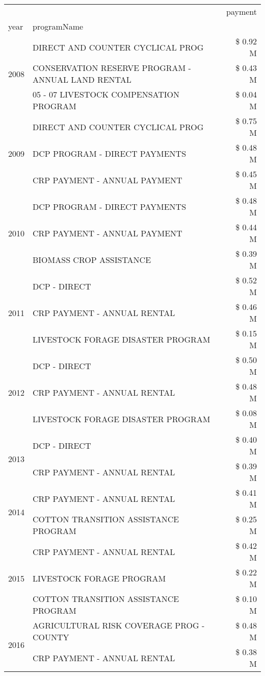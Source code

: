 \begin{tabular}{llr}
\toprule
 &  & payment \\
year & programName &  \\
\midrule
\multirow[t]{3}{*}{2008} & DIRECT AND COUNTER CYCLICAL PROG & \$ 0.92 M \\
 & CONSERVATION RESERVE PROGRAM - ANNUAL LAND RENTAL & \$ 0.43 M \\
 & 05 - 07 LIVESTOCK COMPENSATION PROGRAM & \$ 0.04 M \\
\cline{1-3}
\multirow[t]{3}{*}{2009} & DIRECT AND COUNTER CYCLICAL PROG & \$ 0.75 M \\
 & DCP PROGRAM - DIRECT PAYMENTS & \$ 0.48 M \\
 & CRP PAYMENT - ANNUAL PAYMENT & \$ 0.45 M \\
\cline{1-3}
\multirow[t]{3}{*}{2010} & DCP PROGRAM - DIRECT PAYMENTS & \$ 0.48 M \\
 & CRP PAYMENT - ANNUAL PAYMENT & \$ 0.44 M \\
 & BIOMASS CROP ASSISTANCE & \$ 0.39 M \\
\cline{1-3}
\multirow[t]{3}{*}{2011} & DCP - DIRECT & \$ 0.52 M \\
 & CRP PAYMENT - ANNUAL RENTAL & \$ 0.46 M \\
 & LIVESTOCK FORAGE DISASTER PROGRAM & \$ 0.15 M \\
\cline{1-3}
\multirow[t]{3}{*}{2012} & DCP - DIRECT & \$ 0.50 M \\
 & CRP PAYMENT - ANNUAL RENTAL & \$ 0.48 M \\
 & LIVESTOCK FORAGE DISASTER PROGRAM & \$ 0.08 M \\
\cline{1-3}
\multirow[t]{2}{*}{2013} & DCP - DIRECT & \$ 0.40 M \\
 & CRP PAYMENT - ANNUAL RENTAL & \$ 0.39 M \\
\cline{1-3}
\multirow[t]{2}{*}{2014} & CRP PAYMENT - ANNUAL RENTAL & \$ 0.41 M \\
 & COTTON TRANSITION ASSISTANCE PROGRAM & \$ 0.25 M \\
\cline{1-3}
\multirow[t]{3}{*}{2015} & CRP PAYMENT - ANNUAL RENTAL & \$ 0.42 M \\
 & LIVESTOCK FORAGE PROGRAM & \$ 0.22 M \\
 & COTTON TRANSITION ASSISTANCE PROGRAM & \$ 0.10 M \\
\cline{1-3}
\multirow[t]{3}{*}{2016} & AGRICULTURAL RISK COVERAGE PROG - COUNTY & \$ 0.48 M \\
 & CRP PAYMENT - ANNUAL RENTAL & \$ 0.38 M \\

\end{tabular}
